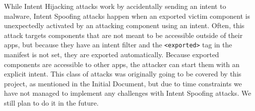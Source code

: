     While Intent Hijacking attacks work by accidentally sending an intent to malware, Intent Spoofing attacks happen when an exported victim component is unexpectedly activated by an attacking component using an intent. Often, this attack targets components that are not meant to be accessible outside of their apps, but because they have an intent filter and the \lstinline|<exported>| tag in the manifest is not set, they are exported automatically. Because exported components are accessible to other apps, the attacker can start them with an explicit intent. This class of attacks was originally going to be covered by this project, as mentioned in the Initial Document, but due to time constraints we have not managed to implement any challenges with Intent Spoofing attacks. We still plan to do it in the future.
    